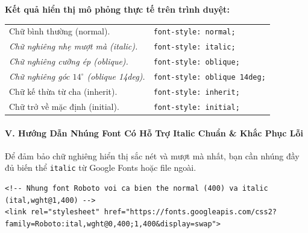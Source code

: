 \documentclass[11pt,oneside]{book}
\newcommand{\codeinline}[1]{\textcolor{accentOrange}{\texttt{#1}}}
\begin{document}
\begin{browserWindow}
\begin{tcolorbox}[arc=4pt, colback=white, colframe=primaryBlue!30, boxrule=0.8pt, top=10pt, bottom=10pt, left=12pt, right=12pt]
  {\sffamily\bfseries\color{primaryBlue} Kết quả hiển thị mô phỏng thực tế trên trình duyệt:}\par\vspace{6pt}
  \begin{tabular}{@{}l l@{}}
    {\sffamily\fontsize{12}{15}\selectfont Chữ bình thường (normal).} & {\sffamily\small\color{gray!70} \codeinline{font-style: normal;}} \\ [5pt]
    {\sffamily\itshape\fontsize{12}{15}\selectfont Chữ nghiêng nhẹ mượt mà (italic).} & {\sffamily\small\color{gray!70} \codeinline{font-style: italic;}} \\ [5pt]
    {\sffamily\slshape\fontsize{12}{15}\selectfont Chữ nghiêng cưỡng ép (oblique).} & {\sffamily\small\color{gray!70} \codeinline{font-style: oblique;}} \\ [5pt]
    {\sffamily\slshape\fontsize{12}{15}\selectfont Chữ nghiêng góc $14^\circ$ (oblique 14deg).} & {\sffamily\small\color{gray!70} \codeinline{font-style: oblique 14deg;}} \\ [5pt]
    {\sffamily\fontsize{12}{15}\selectfont Chữ kế thừa từ cha (inherit).} & {\sffamily\small\color{gray!70} \codeinline{font-style: inherit;}} \\ [5pt]
    {\sffamily\fontsize{12}{15}\selectfont Chữ trở về mặc định (initial).} & {\sffamily\small\color{gray!70} \codeinline{font-style: initial;}} \\
  \end{tabular}
\end{tcolorbox}
\end{browserWindow}

\paragraph*{V. Hướng Dẫn Nhúng Font Có Hỗ Trợ Italic Chuẩn \& Khắc Phục Lỗi}

Để đảm bảo chữ nghiêng hiển thị sắc nét và mượt mà nhất, bạn cần nhúng đầy đủ biến thể \codeinline{italic} từ Google Fonts hoặc file ngoài.

\begin{codeWindow}
\begin{lstlisting}[language=HTML5]
<!-- Nhung font Roboto voi ca bien the normal (400) va italic (ital,wght@1,400) -->
<link rel="stylesheet" href="https://fonts.googleapis.com/css2?family=Roboto:ital,wght@0,400;1,400&display=swap">
\end{lstlisting}
\end{codeWindow}
\end{document}
